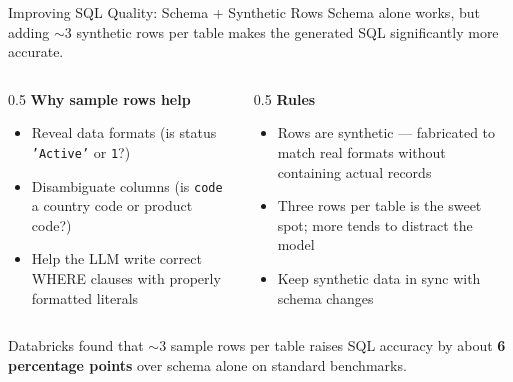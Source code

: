 \documentclass[aspectratio=169]{beamer}
\begin{document}
\begin{frame}{Improving SQL Quality: Schema + Synthetic Rows}
Schema alone works, but adding \alert{$\sim$3 synthetic rows per table} makes the generated SQL significantly more accurate.
\vspace{0.3cm}
\begin{columns}[T]
\begin{column}{0.5\textwidth}
\textbf{Why sample rows help}
\begin{itemize}\small
  \item Reveal data formats (is status \texttt{'Active'} or \texttt{1}?)
  \item Disambiguate columns (is \texttt{code} a country code or product code?)
  \item Help the LLM write correct WHERE clauses with properly formatted literals
\end{itemize}
\end{column}
\begin{column}{0.5\textwidth}
\textbf{Rules}
\begin{itemize}\small
  \item Rows are \alert{synthetic} --- fabricated to match real formats without containing actual records
  \item Three rows per table is the sweet spot; more tends to distract the model
  \item Keep synthetic data in sync with schema changes
\end{itemize}
\end{column}
\end{columns}
\vspace{0.3cm}
Databricks found that $\sim$3 sample rows per table raises SQL accuracy by about \textbf{6 percentage points} over schema alone on standard benchmarks.
\end{frame}
\end{document}
